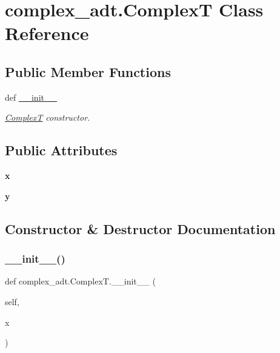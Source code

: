 \hypertarget{classcomplex__adt_1_1_complex_t}{}\section{complex\+\_\+adt.\+ComplexT Class Reference}
\label{classcomplex__adt_1_1_complex_t}
\subsection*{Public Member Functions}
\begin{DoxyCompactItemize}
\item 
def \hyperlink{classcomplex__adt_1_1_complex_t_a548b6a454baa3e00a51bde429b5f0eee}{\+\_\+\+\_\+init\+\_\+\+\_\+}
\begin{DoxyCompactList}\small\item\em \hyperlink{classcomplex__adt_1_1_complex_t}{ComplexT} constructor. \end{DoxyCompactList}\end{DoxyCompactItemize}
\subsection*{Public Attributes}
\begin{DoxyCompactItemize}
\item 
\mbox{\label{classcomplex__adt_1_1_complex_t_a1aad64f976e595cfcd696df5d0409962}} 
{\bfseries x}
\item 
\mbox{\label{classcomplex__adt_1_1_complex_t_a31481d8250df9e06d34687fe719bbd63}} 
{\bfseries y}
\end{DoxyCompactItemize}


\subsection{Constructor \& Destructor Documentation}
\mbox{\label{classcomplex__adt_1_1_complex_t_a548b6a454baa3e00a51bde429b5f0eee}} 
\subsubsection{\texorpdfstring{\+\_\+\+\_\+init\+\_\+\+\_\+()}{\_\_init\_\_()}}
{\footnotesize\ttfamily def complex\+\_\+adt.\+Complex\+T.\+\_\+\+\_\+init\+\_\+\+\_\+ (\begin{DoxyParamCaption}\item[{}]{self,  }\item[{}]{x }\end{DoxyParamCaption})}



